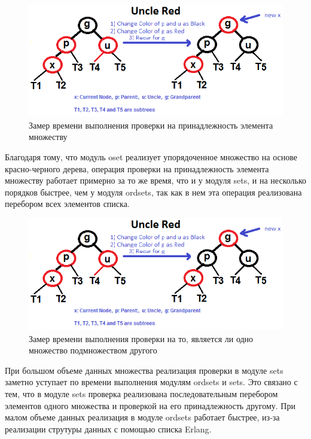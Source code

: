 		\begin{figure}[H]
				\centering
				\includegraphics[width=\textwidth]{img/tan-aus.png}
				\caption{Замер времени выполнения проверки на принадлежность элемента множеству}
		\end{figure}
		Благодаря тому, что модуль oset реализует упорядоченное множество на основе красно-черного дерева, операция
		проверки на принадлежность элемента множеству работает примерно за то же время, что и у модуля sets, и на 
		несколько порядков быстрее, чем у модуля ordsets, так как в нем эта операция реализована перебором всех элементов
		списка.  
		
		\begin{figure}[H]
				\centering
				\includegraphics[width=\textwidth]{img/tan-aus.png}
				\caption{Замер времени выполнения проверки на то, является ли одно множество подмножеством другого}
		\end{figure}
		При большом объеме данных множества реализация проверки в модуле sets заметно уступает по времени 
		выполнения модулям ordsets и sets. Это связано с тем, что в модуле sets проверка реализована 
		последовательным перебором элементов одного множества и проверкой на его принадлежность другому. При малом 
		объеме данных реализация в модуле ordsets работает быстрее, из-за реализации струтуры данных с помощью 
		списка Erlang.  
		

